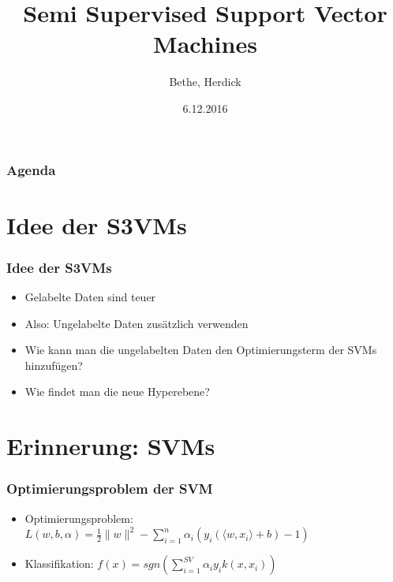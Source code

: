 \documentclass{beamer}
\title{Semi Supervised Support Vector Machines}
\author{Bethe, Herdick}
\date{6.12.2016}
\institute{Classification Algorithms FIN OvGU}
\begin{document}

\newcommand {\framedgraphic}[2] {
    \begin{frame}{#1}
        \begin{center}
            \texttt{[image: \#2]}
        \end{center}
    \end{frame}
}

\begin{frame}[plain]
\titlepage
\end{frame}


\section[Agenda]{}
\begin{frame}
\frametitle{Agenda}
\tableofcontents
\end{frame}

\section{Idee der S3VMs}
\begin{frame}
\frametitle{Idee der S3VMs}
    \begin{itemize}
        \item Gelabelte Daten sind teuer
        \item Also: Ungelabelte Daten zus\"atzlich verwenden
        \item Wie kann man die ungelabelten Daten den Optimierungsterm der SVMs hinzuf\"ugen?
        \item Wie findet man die neue Hyperebene?
    \end{itemize}
\end{frame}




\section{Erinnerung: SVMs}

\begin{frame}
\frametitle{Optimierungsproblem der SVM}
    \begin{itemize}
    	\item Optimierungsproblem: $L(w,b,\alpha)=\frac{1}{2} \|w\|^2 - \sum_{i=1}^{n} \alpha_i (y_i(\big \langle w,x_i \big\rangle + b)-1)$
    	\item Klassifikation: $f(x) = sgn\left(\sum_{i=1}^{SV} \alpha_i y_i k(x, x_i)\right)$
    \end{itemize} 
\end{frame}
\end{document}
